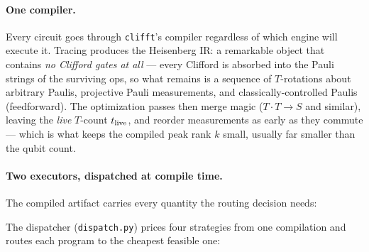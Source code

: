 \documentclass[11pt]{article}
\begin{document}
\paragraph{One compiler.} Every circuit goes through \texttt{clifft}'s
compiler regardless of which engine will execute it. Tracing produces the
Heisenberg IR: a remarkable object that contains \emph{no Clifford gates at
all} --- every Clifford is absorbed into the Pauli strings of the surviving
ops, so what remains is a sequence of $T$-rotations about arbitrary Paulis,
projective Pauli measurements, and classically-controlled Paulis
(feedforward). The optimization passes then merge magic ($T\!\cdot\!T\to S$
and similar), leaving the \emph{live} $T$-count $t_{\rm live}$, and reorder
measurements as early as they commute --- which is what keeps the compiled
peak rank $k$ small, usually far smaller than the qubit count.

\paragraph{Two executors, dispatched at compile time.} The compiled artifact
carries every quantity the routing decision needs:

\begin{center}
\end{center}

The dispatcher (\texttt{dispatch.py}) prices four strategies from one
compilation and routes each program to the cheapest feasible one:
\end{document}
